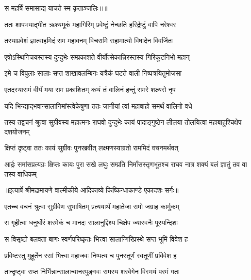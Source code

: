 {स महर्षिं समासाद्य याचते स्म कृताञ्जलिः॥॥} %

\addtocounter{shlokacount}{1}

\twolineshloka
{ततः शापभयाद्भीत ऋश्यमूकं महागिरिम्}
{प्रवेष्टुं नेच्छति हरिर्द्रष्टुं वापि नरेश्वर} %

\twolineshloka
{तस्याप्रवेशं ज्ञात्वाहमिदं राम महावनम्}
{विचरामि सहामात्यो विषादेन विवर्जितः} %

\twolineshloka
{एषोऽस्थिनिचयस्तस्य दुन्दुभेः सम्प्रकाशते}
{वीर्योत्सेकान्निरस्तस्य गिरिकूटनिभो महान्} %

\twolineshloka
{इमे च विपुलाः सालाः सप्त शाखावलम्बिनः}
{यत्रैकं घटते वाली निष्पत्रयितुमोजसा} %

\twolineshloka
{एतदस्यासमं वीर्यं मया राम प्रकाशितम्}
{कथं तं वालिनं हन्तुं समरे शक्ष्यसे नृप} %

\twolineshloka
{यदि भिन्द्याद्भवान्सालानिमांस्त्वेकेषुणा ततः}
{जानीयां त्वां महाबाहो समर्थं वालिनो वधे} %

\threelineshloka
{तस्य तद्वचनं श्रुत्वा सुग्रीवस्य महात्मनः}
{राघवो दुन्दुभेः कायं पादाङ्गुष्ठेन लीलया}
{तोलयित्वा महाबाहुश्चिक्षेप दशयोजनम्} %

\twolineshloka
{क्षिप्तं दृष्ट्वा ततः कायं सुग्रीवः पुनरब्रवीत्}
{लक्ष्मणस्याग्रतो राममिदं वचनमर्थवत्} %

\threelineshloka
{आर्द्रः समांसप्रत्यग्रः क्षिप्तः कायः पुरा सखे}
{लघुः सम्प्रति निर्मांसस्तृणभूतश्च राघव}
{नात्र शक्यं बलं ज्ञातुं तव वा तस्य वाधिकम्} %


{॥इत्यार्षे श्रीमद्रामायणे वाल्मीकीये आदिकाव्ये किष्किन्धाकाण्डे एकादशः सर्गः॥}


\twolineshloka
{एतच्च वचनं श्रुत्वा सुग्रीवेण सुभाषितम्}
{प्रत्ययार्थं महातेजा रामो जग्राह कार्मुकम्} %

\twolineshloka
{स गृहीत्वा धनुर्घोरं शरमेकं च मानदः}
{सालानुद्दिश्य चिक्षेप ज्यास्वनैः पूरयन्दिशः} %

\twolineshloka
{स विसृष्टो बलवता बाणः स्वर्णपरिष्कृतः}
{भित्त्वा सालान्गिरिप्रस्थे सप्त भूमिं विवेश ह} %

\twolineshloka
{प्रविष्टस्तु मुहूर्तेन रसां भित्त्वा महाजवः}
{निष्पत्य च पुनस्तूर्णं स्वतूणीं प्रविवेश ह} %

\twolineshloka
{तान्दृष्ट्वा सप्त निर्भिन्नान्सालान्वानरपुङ्गवः}
{रामस्य शरवेगेन विस्मयं परमं गतः} %

